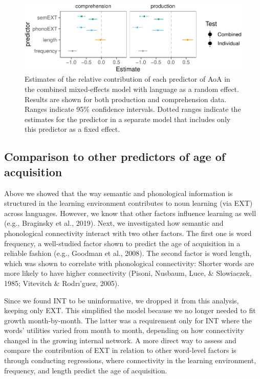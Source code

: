 \documentclass[english,,man,floatsintext]{apa6}
\begin{document}
\begin{figure}[!h]
\includegraphics[width=\textwidth]{ms_files/figure-latex/staticAll-1} \caption{Estimates of the relative contribution of each predictor of AoA in the combined mixed-effects model with language as a random effect. Results are shown for both production and comprehension data. Ranges indicate 95\% confidence intervals. Dotted ranges indicate the estimates for the predictor in a separate model that includes only this predictor as a fixed effect.}\label{fig:staticAll}
\end{figure}

\hypertarget{comparison-to-other-predictors-of-age-of-acquisition}{%
\subsection{Comparison to other predictors of age of acquisition}\label{comparison-to-other-predictors-of-age-of-acquisition}}

Above we showed that the way semantic and phonological information is structured in the learning environment contributes to noun learning (via EXT) across languages. However, we know that other factors influence learning as well (e.g., Braginsky et al., 2019). Next, we investigated how semantic and phonological connectivity interact with two other factors. The first one is word frequency, a well-studied factor shown to predict the age of acquisition in a reliable fashion (e.g., Goodman et al., 2008). The second factor is word length, which was shown to correlate with phonological connectivity: Shorter words are more likely to have higher connectivity (Pisoni, Nusbaum, Luce, \& Slowiaczek, 1985; Vitevitch \& Rodrı'guez, 2005).

Since we found INT to be uninformative, we dropped it from this analysis, keeping only EXT. This simplified the model because we no longer needed to fit growth month-by-month. The latter was a requirement only for INT where the words' utilities varied from month to month, depending on how connectivity changed in the growing internal network. A more direct way to assess and compare the contribution of EXT in relation to other word-level factors is through conducting regressions, where connectivity in the learning environment, frequency, and length predict the age of acquisition.
\end{document}
